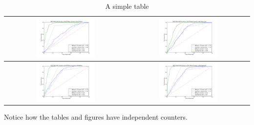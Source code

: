 \documentclass[a4paper,12pt]{article}
\begin{document}
\begin{table}[h!]
  \begin{center}
    \begin{tabular}{| c | c |}
    \hline
    \includegraphics[width=0.5\textwidth]{figures/ROC-Economics}
    &
    \includegraphics[width=0.5\textwidth]{figures/ROC-Business-Law}
    \\
    \hline
    \includegraphics[width=0.5\textwidth]{figures/ROC-Marketing}
	&    
    \includegraphics[width=0.5\textwidth]{figures/ROC-Management}
    \\
    \hline
    \end{tabular}
  \end{center}
  \caption{A simple table}
\end{table}


Notice how the tables and figures
have independent counters.
\end{document}
